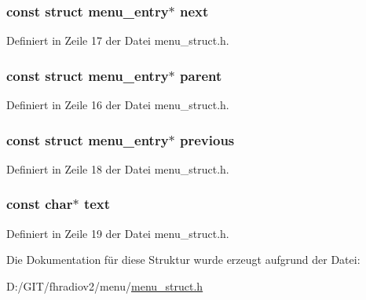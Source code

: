 \subsubsection[{next}]{\setlength{\rightskip}{0pt plus 5cm}const struct {\bf menu\+\_\+entry}$\ast$ next}\label{structmenu__entry_a8667330bb5cb56772e88abd901064211}


Definiert in Zeile 17 der Datei menu\+\_\+struct.\+h.

\hypertarget{structmenu__entry_ac1b562fabcc9402003931e8351d6faf7}{}
\subsubsection[{parent}]{\setlength{\rightskip}{0pt plus 5cm}const struct {\bf menu\+\_\+entry}$\ast$ parent}\label{structmenu__entry_ac1b562fabcc9402003931e8351d6faf7}


Definiert in Zeile 16 der Datei menu\+\_\+struct.\+h.

\hypertarget{structmenu__entry_a66676e2c3f7553b50a8c1d0c4e973734}{}
\subsubsection[{previous}]{\setlength{\rightskip}{0pt plus 5cm}const struct {\bf menu\+\_\+entry}$\ast$ previous}\label{structmenu__entry_a66676e2c3f7553b50a8c1d0c4e973734}


Definiert in Zeile 18 der Datei menu\+\_\+struct.\+h.

\hypertarget{structmenu__entry_a16343090e80c4472521560f30113d96c}{}
\subsubsection[{text}]{\setlength{\rightskip}{0pt plus 5cm}const char$\ast$ text}\label{structmenu__entry_a16343090e80c4472521560f30113d96c}


Definiert in Zeile 19 der Datei menu\+\_\+struct.\+h.



Die Dokumentation für diese Struktur wurde erzeugt aufgrund der Datei\+:\begin{DoxyCompactItemize}
\item 
D\+:/\+G\+I\+T/fhradiov2/menu/\hyperlink{menu__struct_8h}{menu\+\_\+struct.\+h}\end{DoxyCompactItemize}
